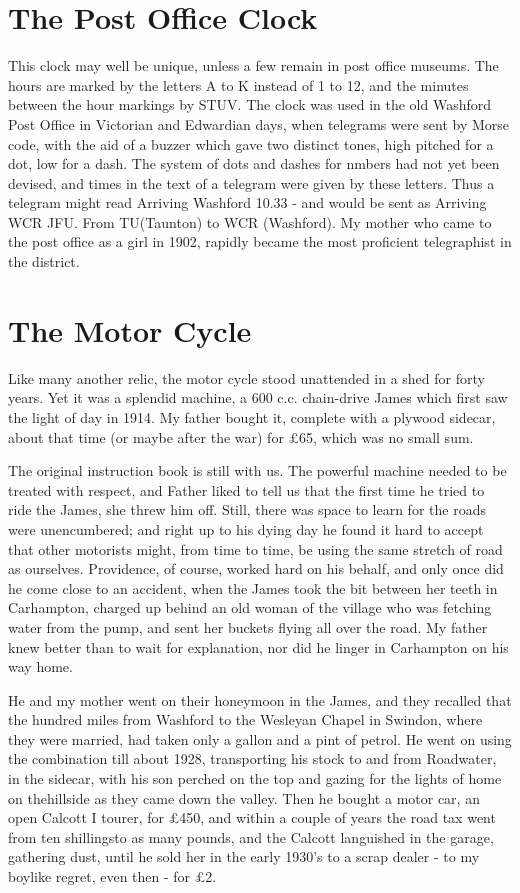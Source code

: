 \section{The Post Office Clock}

This clock may well be unique, unless a few remain in post office museums. The hours are marked by the letters A to K instead of 1 to 12, and the minutes between the hour markings by STUV. The clock was used in the old Washford Post Office in Victorian and Edwardian days, when telegrams were sent by Morse code, with the aid of a buzzer which gave two distinct tones, high pitched for a dot, low for a dash. The system of dots and dashes for nmbers had not yet been devised, and times in the text of a telegram were given by these letters. Thus a telegram might read Arriving Washford 10.33 - and would be sent as Arriving WCR JFU. From TU(Taunton) to WCR (Washford).
My mother who came to the post office as a girl in 1902, rapidly became the most proficient telegraphist in the district.
 
\section{The Motor Cycle}

Like many another relic, the motor cycle stood unattended in a shed for forty years. Yet it was a splendid machine, a 600 c.c. chain-drive James which first saw the light of day in 1914. My father bought it, complete with a plywood sidecar, about that time (or maybe after the war) for £65, which was no small sum.

The original instruction book is still with us. The powerful machine needed to be treated with respect, and Father liked to tell us that the first time he tried to ride the James, she threw him off. Still, there was space to learn for the roads were unencumbered; and right up to his dying day he found it hard to accept that other motorists might, from time to time, be using the same stretch of road as ourselves. Providence, of course, worked hard on his behalf, and only once did he come close to an accident, when the James took the bit between her teeth in Carhampton, charged up behind an old woman of the village who was fetching water from the pump, and sent her buckets flying all over the road. My father knew better than to wait for explanation, nor did he linger in Carhampton on his way home. 

He and my mother went on their honeymoon in the James, and they recalled that the hundred miles from Washford to the Wesleyan Chapel in Swindon, where they were married, had taken only a gallon and a pint of petrol. He went on using the combination till about 1928, transporting his stock to and from Roadwater, in the sidecar, with his son perched on the top and gazing for the lights of home on thehillside as they came down the valley. Then he bought a motor car, an open Calcott I tourer, for £450, and within a couple of years the road tax went from ten shillingsto as many pounds, and the Calcott languished in the garage, gathering dust, until he sold her in the early 1930's to a scrap dealer - to my boylike regret, even then - for £2.
 
